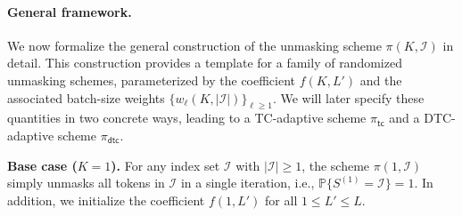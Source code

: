 \documentclass[english]{article}
\newcommand{\cI}{\mathcal{I}}
\newcommand{\bP}{\mathbb{P}}
\newcommand{\tc}{\mathsf{tc}}
\newcommand{\dtc}{\mathsf{dtc}}
\begin{document}
\paragraph{General framework.}
We now formalize the general construction of the unmasking scheme $\pi(K, \cI)$ in detail.
This construction provides a template for a family of randomized unmasking schemes, parameterized by the coefficient \(f(K,L')\) and the associated batch-size weights \(\{w_\ell(K,|\cI|)\}_{\ell\ge1}\).
We will later specify these quantities in two concrete ways, leading to a TC-adaptive scheme $\pi_\tc$ and a DTC-adaptive scheme $\pi_\dtc$.

\medskip
\noindent\textbf{Base case ($K = 1$).}
For any index set $ \cI $ with $|\cI| \geq 1$, the scheme $\pi(1, \cI)$ simply unmasks all tokens in $\cI$ in a single iteration, i.e., $\bP\{S^{(1)} = \cI\} = 1$.
%
In addition, we initialize the coefficient $f(1, L')$ for all $1 \leq L' \leq L$.
\end{document}
